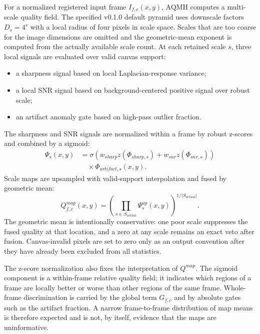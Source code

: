\documentclass[10pt,twocolumn]{article}
\begin{document}
For a normalized registered input frame $I_{f,c}(x,y)$, AQMH computes a multi-scale quality
field. The specified v0.1.0 default pyramid uses downscale factors $D_s=4^s$ with a local radius of four
pixels in scale space. Scales that are too coarse for the image dimensions are omitted and the
geometric-mean exponent is computed from the actually available scale count. At each retained
scale $s$, three local signals are evaluated over valid canvas support:
\begin{itemize}
  \item a sharpness signal based on local Laplacian-response variance;
  \item a local SNR signal based on background-centered positive signal over robust scale;
  \item an artifact anomaly gate based on high-pass outlier fraction.
\end{itemize}
The sharpness and SNR signals are normalized within a frame by robust z-scores and combined by a
sigmoid:
\begin{equation}
\begin{split}
  \Psi_s(x,y) &=
  \sigma\!\left(
    w_{sharp} z(\Phi_{sharp,s})
    + w_{snr} z(\Phi_{snr,s})
  \right) \\
  &\quad \times \Phi_{artifact,s}(x,y).
\end{split}
\end{equation}
Scale maps are upsampled with valid-support interpolation and fused by geometric mean:
\begin{equation}
  Q_{f,c}^{map}(x,y) =
  \left(\prod_{s \in S_{actual}} \Psi_s^{up}(x,y)\right)^{1/|S_{actual}|}.
\end{equation}
The geometric mean is intentionally conservative: one poor scale suppresses the fused quality at
that location, and a zero at any scale remains an exact veto after fusion. Canvas-invalid pixels
are set to zero only as an output convention after they have already been excluded from all
statistics.

The z-score normalization also fixes the interpretation of $Q^{map}$. The sigmoid component is a
within-frame relative quality field; it indicates which regions of a frame are locally better or
worse than other regions of the same frame. Whole-frame discrimination is carried by the global
term $G_{f,c}$ and by absolute gates such as the artifact fraction. A narrow frame-to-frame
distribution of map means is therefore expected and is not, by itself, evidence that the maps are
uninformative.
\end{document}
